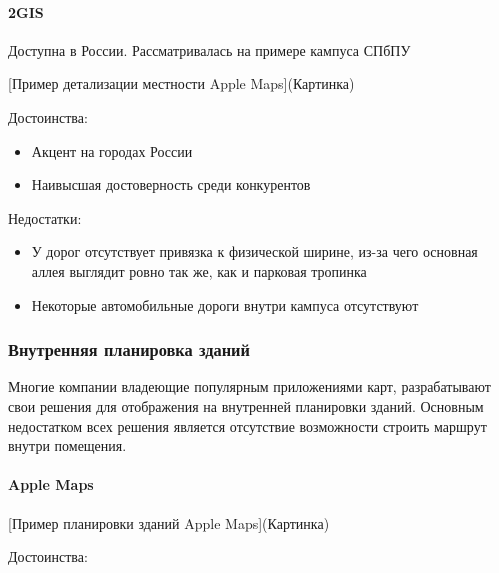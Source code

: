       \paragraph{2GIS}
        Доступна в России. Рассматривалась на примере кампуса СПбПУ

        [Пример детализации местности Apple Maps](Картинка)

        \noindent Достоинства:
        \begin{itemize}
          \item Акцент на городах России
          \item Наивысшая достоверность среди конкурентов
        \end{itemize}

        \noindent Недостатки:
        \begin{itemize}
          \item У дорог отсутствует привязка к физической ширине, из-за чего основная аллея выглядит ровно так же, как и парковая тропинка
          \item Некоторые автомобильные дороги внутри кампуса отсутствуют
        \end{itemize}


    \subsubsection{Внутренняя планировка зданий}
      Многие компании владеющие популярным приложениями карт, разрабатывают свои решения для отображения на внутренней планировки зданий. Основным недостатком всех решения является отсутствие возможности строить маршрут внутри помещения.


      \paragraph{Apple Maps}
        [Пример планировки зданий Apple Maps](Картинка)

        \noindent Достоинства:

